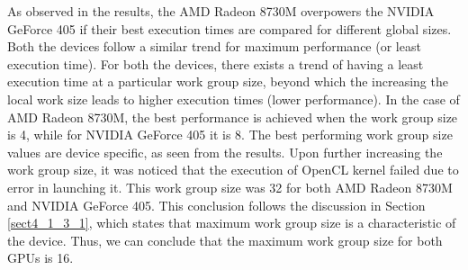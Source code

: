 As observed in the results, the AMD Radeon 8730M overpowers the NVIDIA GeForce 405 if their best execution times are compared for different global sizes. Both the devices follow a similar trend for maximum performance (or least execution time). For both the devices, there exists a trend of having a least execution time at a particular work group size, beyond which the increasing the local work size leads to higher execution times (lower performance). In the case of AMD Radeon 8730M, the best performance is achieved when the work group size is 4, while for NVIDIA GeForce 405 it is 8. The best performing work group size values are device specific, as seen from the results. \newline\newline
Upon further increasing the work group size, it was noticed that the execution of OpenCL kernel failed due to error in launching it. This work group size was 32 for both AMD Radeon 8730M and NVIDIA GeForce 405. This conclusion follows the discussion in Section \ref{sect4_1_3_1}, which states that maximum work group size is a characteristic of the device. Thus, we can conclude that the maximum work group size for both GPUs is 16. \newline

